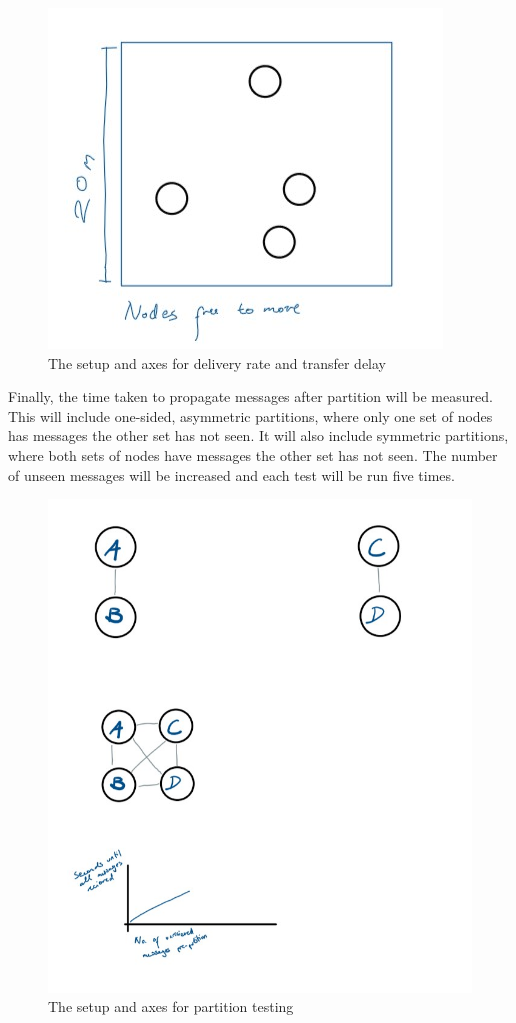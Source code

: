 \documentclass[10pt, a4paper]{article}
\begin{document}
\begin{figure}[h]
\caption{The setup and axes for delivery rate and transfer delay}
\begin{center}
\includegraphics[scale=0.5]{transfer.jpg}
\end{center}
\end{figure}
Finally, the time taken to propagate messages after partition will be measured. This will include one-sided, asymmetric partitions, where only one set of nodes has messages the other set has not seen. It will also include symmetric partitions, where both sets of nodes have messages the other set has not seen. The number of unseen messages will be increased and each test will be run five times.

\begin{figure}[h]
\caption{The setup and axes for partition testing}
\begin{center}
\includegraphics[scale=0.3]{partition.jpg}
\end{center}
\end{figure}
\end{document}
